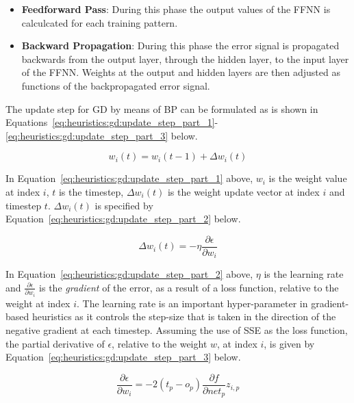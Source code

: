\begin{itemize}
      \item \textbf{Feedforward Pass}: During this phase the output values of the \acs{FFNN} is calculcated for each training pattern.

      \item \textbf{Backward Propagation}: During this phase the error signal is propagated backwards from the output layer, through the hidden layer, to the input layer of the \acs{FFNN}. Weights at the output and hidden layers are then adjusted as functions of the backpropagated error signal.
\end{itemize}

\noindent
The update step for \acs{GD} by means of \acs{BP} can be formulated as is shown in Equations~\eqref{eq:heuristics:gd:update_step_part_1}-\eqref{eq:heuristics:gd:update_step_part_3} below.

\begin{equation}
      \label{eq:heuristics:gd:update_step_part_1}
      w_{i}(t) = w_{i}(t-1) + \Delta w_{i}(t)
\end{equation}

\noindent
In Equation~\eqref{eq:heuristics:gd:update_step_part_1} above, $w_{i}$ is the weight value at index $i$, $t$ is the timestep, $\Delta w_{i}(t)$ is the weight update vector at index $i$ and timestep $t$. $\Delta w_{i}(t)$ is specified by Equation~\eqref{eq:heuristics:gd:update_step_part_2} below.

\begin{equation}
      \label{eq:heuristics:gd:update_step_part_2}
      \Delta w_{i}(t) = -\eta\frac{\partial \epsilon}{\partial w_{i}}
\end{equation}

\noindent
In Equation~\eqref{eq:heuristics:gd:update_step_part_2} above, $\eta$ is the learning rate and $\frac{\partial \epsilon}{\partial w_{i}}$ is the \textit{gradient} of the error, as a result of a loss function, relative to the weight at index $i$. The learning rate is an important hyper-parameter in gradient-based heuristics as it controls the step-size that is taken in the direction of the negative gradient at each timestep. Assuming the use of \acs{SSE} as the loss function, the partial derivative of $\epsilon$, relative to the weight $w$, at index $i$, is given by Equation~\eqref{eq:heuristics:gd:update_step_part_3} below.

\begin{equation}
      \label{eq:heuristics:gd:update_step_part_3}
      \frac{\partial \epsilon}{\partial w_{i}} = -2(t_{p} - o_{p})\frac{\partial f}{\partial net_{p}}z_{i,p}
\end{equation}


